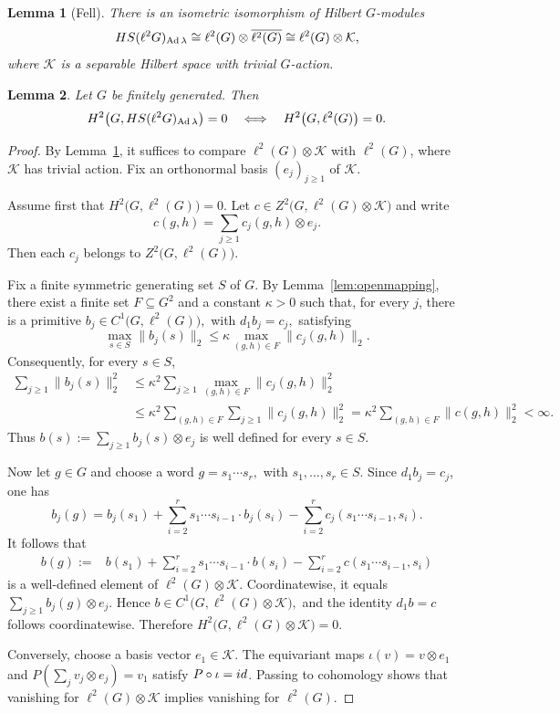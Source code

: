 \documentclass[10pt,a4paper]{amsart}
\newtheorem{lemma}{Lemma}
\DeclareMathOperator{\Ad}{Ad}
\newcommand{\HS}{{\rm HS}}
\newcommand{\La}{\lambda}
\newcommand{\ol}[1]{\overline{#1}}
\begin{document}
\begin{lemma}[Fell]\label{lem:HSdecomp}
There is an isometric isomorphism of Hilbert $G$-modules
\[
\HS(\ell^2 G)_{\Ad\La}\cong \ell^2(G)\otimes \ol{\ell^2(G)}\cong \ell^2(G)\otimes \mathcal K,
\]
where $\mathcal K$ is a separable Hilbert space with trivial $G$-action.
\end{lemma}

\begin{lemma}\label{lem:transfer}
Let $G$ be finitely generated. Then
\[
H^2\bigl(G,\HS(\ell^2 G)_{\Ad\La}\bigr)=0
\quad\Longleftrightarrow\quad
H^2\bigl(G,\ell^2(G)\bigr)=0.
\]
\end{lemma}

\begin{proof}
By Lemma~\ref{lem:HSdecomp}, it suffices to compare
$\ell^2(G)\otimes\mathcal K$ with $\ell^2(G)$, where
$\mathcal K$ has trivial action. Fix an orthonormal basis
$(e_j)_{j\ge 1}$ of $\mathcal K$.

Assume first that
$
H^2\bigl(G,\ell^2(G)\bigr)=0.
$
Let
$
c\in Z^2\bigl(G,\ell^2(G)\otimes\mathcal K\bigr)
$
and write
\[
c(g,h)=\sum_{j\ge 1}c_j(g,h)\otimes e_j.
\]
Then each $c_j$ belongs to
$Z^2\bigl(G,\ell^2(G)\bigr)$.

Fix a finite symmetric generating set $S$ of $G$. By
Lemma~\ref{lem:openmapping}, there exist a finite set
$F\subseteq G^2$ and a constant $\kappa>0$ such that, for
every $j$, there is a primitive
$
b_j\in C^1\bigl(G,\ell^2(G)\bigr),$ with $
d_1b_j=c_j,$
satisfying
\[
\max_{s\in S}\|b_j(s)\|_2
\leq
\kappa\max_{(g,h)\in F}\|c_j(g,h)\|_2.
\]
Consequently, for every $s\in S$,
\[
\begin{aligned}
\sum_{j\ge 1}\|b_j(s)\|_2^2
&\leq
\kappa^2
\sum_{j\ge 1}
\max_{(g,h)\in F}\|c_j(g,h)\|_2^2 \\
&\leq
\kappa^2
\sum_{(g,h)\in F}
\sum_{j\ge 1}\|c_j(g,h)\|_2^2 
=
\kappa^2
\sum_{(g,h)\in F}\|c(g,h)\|_2^2
<\infty.
\end{aligned}
\]
Thus
$
b(s):=\sum_{j\ge 1}b_j(s)\otimes e_j
$
is well defined for every $s\in S$.

Now let $g\in G$ and choose a word
$
g=s_1\cdots s_r,$ with $
s_1,\ldots,s_r\in S.$
Since $d_1b_j=c_j$, one has
\[
b_j(g)
=
b_j(s_1)
+
\sum_{i=2}^r
s_1\cdots s_{i-1}\cdot b_j(s_i)
-
\sum_{i=2}^r
c_j(s_1\cdots s_{i-1},s_i).
\]
It follows that
\[
\begin{aligned}
b(g)
:={}&
b(s_1)
+
\sum_{i=2}^r
s_1\cdots s_{i-1}\cdot b(s_i)
-
\sum_{i=2}^r
c(s_1\cdots s_{i-1},s_i)
\end{aligned}
\]
is a well-defined element of
$\ell^2(G)\otimes\mathcal K$. Coordinatewise, it equals
$
\sum_{j\ge 1}b_j(g)\otimes e_j.
$
Hence
$
b\in C^1\bigl(G,\ell^2(G)\otimes\mathcal K\bigr),
$
and the identity $d_1b=c$ follows coordinatewise. Therefore
$
H^2\bigl(G,\ell^2(G)\otimes\mathcal K\bigr)=0.
$

Conversely, choose a basis vector $e_1\in\mathcal K$. The
equivariant maps
$
\iota(v)=v\otimes e_1
$
and
$
P\left(\sum_jv_j\otimes e_j\right)=v_1
$
satisfy $P\circ\iota={\rm id}$. Passing to cohomology shows that
vanishing for $\ell^2(G)\otimes\mathcal K$ implies vanishing
for $\ell^2(G)$.
\end{proof}
\end{document}
